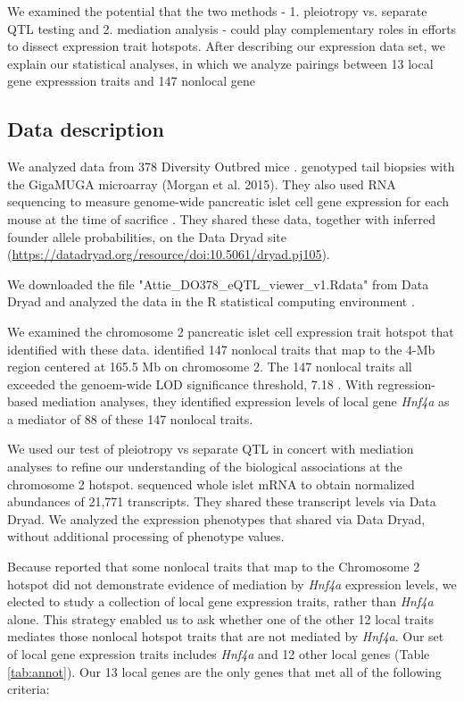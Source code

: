 \documentclass{article}
\begin{document}
We examined the potential that the two methods - 1. pleiotropy vs. separate QTL testing and 2. mediation analysis - could play complementary roles in efforts to dissect expression trait hotspots. After describing our expression data set, we explain our statistical analyses, in which we analyze pairings between 13 local gene expresssion traits and 147 nonlocal gene 


\subsection{Data description}

We analyzed data from 378 Diversity Outbred mice \citep{keller2018genetic}. \citet{keller2018genetic} genotyped tail biopsies with the GigaMUGA microarray (Morgan et al. 2015). They also used RNA sequencing to measure genome-wide pancreatic islet cell gene expression for each mouse at the time of sacrifice \citep{keller2018genetic}. They shared these data, together with inferred founder allele probabilities, on the Data Dryad site (\url{https://datadryad.org/resource/doi:10.5061/dryad.pj105}). 

We downloaded the file "Attie\_DO378\_eQTL\_viewer\_v1.Rdata" from Data Dryad \citep{keller2018genetic} and analyzed the data in the R statistical computing environment \citep{r}.

We examined the chromosome 2 pancreatic islet cell expression trait hotspot that \citet{keller2018genetic} identified with these data. \citet{keller2018genetic} identified 147 nonlocal traits that map to the 4-Mb region centered at 165.5 Mb on chromosome 2. The 147 nonlocal traits all exceeded the genoem-wide LOD significance threshold, 7.18 \citep{keller2018genetic}. With regression-based mediation analyses, they identified expression levels of local gene \emph{Hnf4a} as a mediator of 88 of these 147 nonlocal traits. 

We used our test of pleiotropy vs separate QTL in concert with mediation analyses to refine our understanding of the biological associations at the chromosome 2 hotspot. \citet{keller2018genetic} sequenced whole islet mRNA to obtain normalized abundances of 21,771 transcripts. They shared these transcript levels via Data Dryad. We analyzed the expression phenotypes that \citet{keller2018genetic} shared via Data Dryad, without additional processing of phenotype values. 



Because \citet{keller2018genetic} reported that some nonlocal traits that map to the Chromosome 2 hotspot did not demonstrate evidence of mediation by \emph{Hnf4a} expression levels, we elected to study a collection of local gene expression traits, rather than \emph{Hnf4a} alone. This strategy enabled us to ask whether one of the other 12 local traits mediates those nonlocal hotspot traits that are not mediated by \emph{Hnf4a}. Our set of local gene expression traits includes \emph{Hnf4a} and 12 other local genes (Table \ref{tab:annot}). Our 13 local genes are the only genes that met all of the following criteria:
\end{document}
